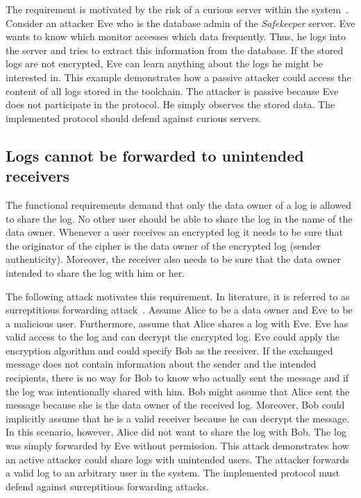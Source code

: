 \documentclass[../main.tex]{subfiles}
\begin{document}
The requirement is motivated by the risk of a curious server within the system~\cite{Nabeel2017}.
Consider an attacker Eve who is the database admin of the \emph{Safekeeper} server.
Eve wants to know which monitor accesses which data frequently.
Thus, he logs into the server and tries to extract this information from the database.
If the stored logs are not encrypted, Eve can learn anything about the logs he might be interested in.
This example demonstrates how a passive attacker could access the content of all logs stored in the toolchain.
The attacker is passive because Eve does not participate in the protocol.
He simply observes the stored data.
The implemented protocol should defend against curious servers.

\subsection{Logs cannot be forwarded to unintended receivers}

The functional requirements demand that only the data owner of a log is allowed to share the log.
No other user should be able to share the log in the name of the data owner.
Whenever a user receives an encrypted log it needs to be sure that the originator of the cipher is the data owner of the encrypted log (sender authenticity).
Moreover, the receiver also needs to be sure that the data owner intended to share the log with him or her.

The following attack motivates this requirement.
In literature, it is referred to as surreptitious forwarding attack~\cite{Davis2001}.
Assume Alice to be a data owner and Eve to be a malicious user.
Furthermore, assume that Alice shares a log with Eve.
Eve has valid access to the log and can decrypt the encrypted log.
Eve could apply the encryption algorithm and could specify Bob as the receiver.
If the exchanged message does not contain information about the sender and the intended recipients, there is no way for Bob to know who actually sent the message and if the log was intentionally shared with him.
Bob might assume that Alice sent the message because she is the data owner of the received log.
Moreover, Bob could implicitly assume that he is a valid receiver because he can decrypt the message.
In this scenario, however, Alice did not want to share the log with Bob.
The log was simply forwarded by Eve without permission.
This attack demonstrates how an active attacker could share logs with unintended users.
The attacker forwards a valid log to an arbitrary user in the system.
The implemented protocol must defend against surreptitious forwarding attacks.
\end{document}
